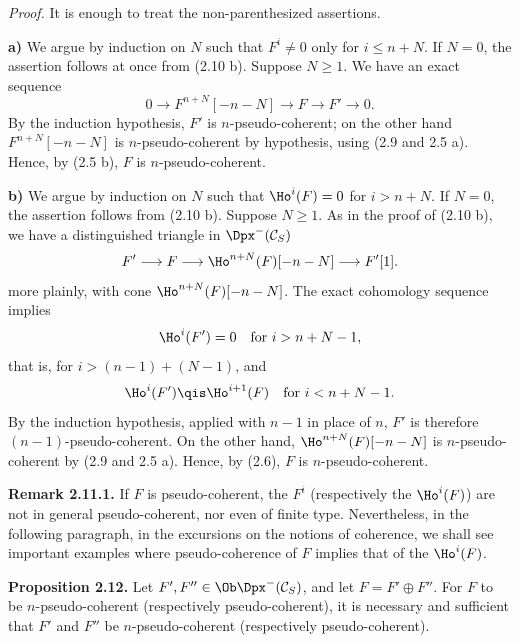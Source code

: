 \emph{Proof.} It is enough to treat the non-parenthesized assertions.

\textbf{a)} We argue by induction on \(N\) such that \(F^i\neq0\) only for \(i\leq n+N\). If \(N=0\), the assertion follows at once from (2.10 b). Suppose \(N\geq1\). We have an exact sequence
\[
  0\longrightarrow F^{n+N}[-n-N]\longrightarrow F\longrightarrow F'\longrightarrow 0 .
\]
By the induction hypothesis, \(F'\) is \(n\)-pseudo-coherent; on the other hand \(F^{n+N}[-n-N]\) is \(n\)-pseudo-coherent by hypothesis, using (2.9 and 2.5 a). Hence, by (2.5 b), \(F\) is \(n\)-pseudo-coherent.

\textbf{b)} We argue by induction on \(N\) such that \(\Ho^i(F)=0\) for \(i>n+N\). If \(N=0\), the assertion follows from (2.10 b). Suppose \(N\geq1\). As in the proof of (2.10 b), we have a distinguished triangle in \(\Dpx^-(\mathcal C_S)\)
\[
  F'\longrightarrow F\longrightarrow \Ho^{n+N}(F)[-n-N]\longrightarrow F'[1].
\]
more plainly, with cone \(\Ho^{n+N}(F)[-n-N]\). The exact cohomology sequence implies
\[
  \Ho^i(F')=0\quad\text{for } i>n+N-1,
\]
that is, for \(i>(n-1)+(N-1)\), and
\[
  \Ho^i(F')\qis \Ho^{i+1}(F)\quad\text{for }i<n+N-1 .
\]
By the induction hypothesis, applied with \(n-1\) in place of \(n\), \(F'\) is therefore \((n-1)\)-pseudo-coherent. On the other hand, \(\Ho^{n+N}(F)[-n-N]\) is \(n\)-pseudo-coherent by (2.9 and 2.5 a). Hence, by (2.6), \(F\) is \(n\)-pseudo-coherent.

\textbf{Remark 2.11.1.} If \(F\) is pseudo-coherent, the \(F^i\) (respectively the \(\Ho^i(F)\)) are not in general pseudo-coherent, nor even of finite type. Nevertheless, in the following paragraph, in the excursions on the notions of coherence, we shall see important examples where pseudo-coherence of \(F\) implies that of the \(\Ho^i(F)\).

\textbf{Proposition 2.12.} Let \(F',F''\in\Ob\Dpx^-(\mathcal C_S)\), and let \(F=F'\oplus F''\). For \(F\) to be \(n\)-pseudo-coherent (respectively pseudo-coherent), it is necessary and sufficient that \(F'
\) and \(F''\) be \(n\)-pseudo-coherent (respectively pseudo-coherent).

